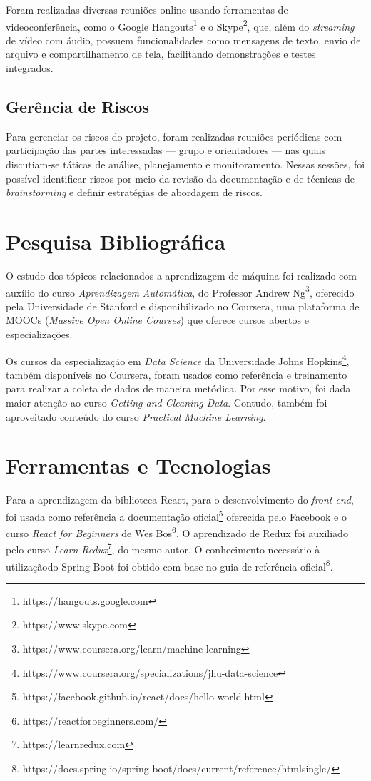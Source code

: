 Foram realizadas diversas reuniões online usando ferramentas de videoconferência, como o Google Hangouts\footnote{https://hangouts.google.com} e o Skype\footnote{https://www.skype.com}, que, além do \emph{streaming} de vídeo com áudio, possuem funcionalidades como mensagens de texto, envio de arquivo e compartilhamento de tela, facilitando demonstrações e testes integrados.

\subsection{Gerência de Riscos}

Para gerenciar os riscos do projeto, foram realizadas reuniões periódicas com participação das partes interessadas --- grupo e orientadores --- nas quais discutiam-se táticas de análise, planejamento e monitoramento. Nessas sessões, foi possível identificar riscos por meio da revisão da documentação e de técnicas de \emph{brainstorming} e definir estratégias de abordagem de riscos.

\section{Pesquisa Bibliográfica}

O estudo dos tópicos relacionados a aprendizagem de máquina foi realizado com auxílio do curso \emph{Aprendizagem Automática}, do Professor Andrew Ng\footnote{ https://www.coursera.org/learn/machine-learning}, oferecido pela Universidade de Stanford e disponibilizado no Coursera, uma plataforma de MOOCs (\textit{Massive Open Online Courses}) que oferece cursos abertos e especializações.

Os cursos da especialização em \textit{Data Science} da Universidade Johns Hopkins\footnote{ https://www.coursera.org/specializations/jhu-data-science}, também disponíveis no Coursera, foram usados como referência e treinamento para realizar a coleta de dados de maneira metódica. Por esse motivo, foi dada maior atenção ao curso \textit{Getting and Cleaning Data}. Contudo, também foi aproveitado conteúdo do curso \textit{Practical Machine Learning}.

\section{Ferramentas e Tecnologias}

Para a aprendizagem da biblioteca React, para o desenvolvimento do \emph{front-end}, foi usada como referência a documentação oficial\footnote{https://facebook.github.io/react/docs/hello-world.html} oferecida pelo Facebook e o curso \textit{React for Beginners} de Wes Bos\footnote{ https://reactforbeginners.com/}. O aprendizado de Redux foi auxiliado pelo curso \textit{Learn Redux}\footnote{https://learnredux.com}, do mesmo autor. O conhecimento necessário à utilizaçãodo Spring Boot foi obtido com base no guia de referência oficial\footnote{https://docs.spring.io/spring-boot/docs/current/reference/htmlsingle/}.

